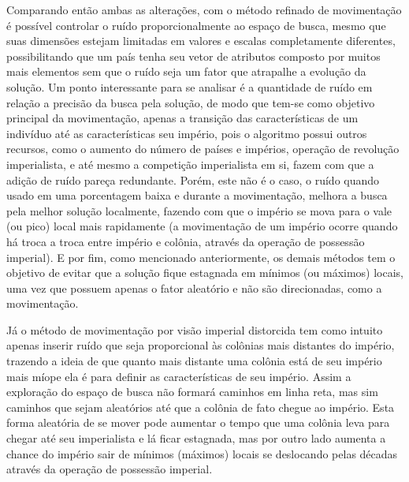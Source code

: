 Comparando então ambas as alterações, com o método refinado de movimentação é possível controlar o ruído proporcionalmente ao espaço de busca, mesmo que suas dimensões estejam limitadas em valores e escalas completamente diferentes, possibilitando que um país tenha seu vetor de atributos composto por muitos mais elementos sem que o ruído seja um fator que atrapalhe a evolução da solução. Um ponto interessante para se analisar é a quantidade de ruído em relação a precisão da busca pela solução, de modo que tem-se como objetivo principal da movimentação, apenas a transição das características de um indivíduo até as características seu império, pois o algoritmo possui outros recursos, como o aumento do número de países e impérios, operação de revolução imperialista, e até mesmo a competição imperialista em si, fazem com que a adição de ruído pareça redundante. Porém, este não é o caso, o ruído quando usado em uma porcentagem baixa e durante a movimentação, melhora a busca pela melhor solução localmente, fazendo com que o império se mova para o vale (ou pico) local mais rapidamente (a movimentação de um império ocorre quando há troca a troca entre império e colônia, através da operação de possessão imperial). E por fim, como mencionado anteriormente, os demais métodos tem o objetivo de evitar que a solução fique estagnada em mínimos (ou máximos) locais, uma vez que possuem apenas o fator aleatório e não são direcionadas, como a movimentação. 

Já o método de movimentação por visão imperial distorcida tem como intuito apenas inserir ruído que seja proporcional às colônias mais distantes do império, trazendo a ideia de que quanto mais distante uma colônia está de seu império mais míope ela é para definir as características de seu império. Assim a exploração do espaço de busca não formará caminhos em linha reta, mas sim caminhos que sejam aleatórios até que a colônia de fato chegue ao império. Esta forma aleatória de se mover pode aumentar o tempo que uma colônia leva para chegar até seu imperialista e lá ficar estagnada, mas por outro lado aumenta a chance do império sair de mínimos (máximos) locais se deslocando pelas décadas através da operação de possessão imperial.

